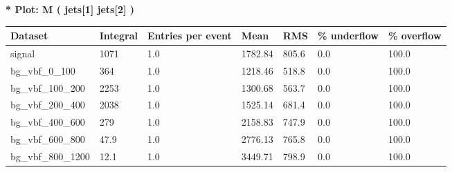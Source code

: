 \documentclass[a4paper, 10pt]{article}
\begin{document}
\textbf{* Plot: M ( jets[1] jets[2] ) }\\
   \begin{table}[H]
  \begin{center}
    \begin{tabular}{|m{23.0mm}|m{23.0mm}|m{18.0mm}|m{19.0mm}|m{19.0mm}|m{19.0mm}|m{19.0mm}|}
      \hline
      {\cellcolor{yellow}         Dataset}& {\cellcolor{yellow}         Integral}& {\cellcolor{yellow}         Entries per event}& {\cellcolor{yellow}         Mean}& {\cellcolor{yellow}         RMS}& {\cellcolor{yellow}         \% underflow}& {\cellcolor{yellow}         \% overflow}\\
      \hline
      {\cellcolor{white}         signal}& {\cellcolor{white}         1071}& {\cellcolor{white}         1.0}& {\cellcolor{white}         1782.84}& {\cellcolor{white}         805.6}& {\cellcolor{red}         0.0}& {\cellcolor{red}         100.0}\\
      \hline
      {\cellcolor{white}         bg\_vbf\_0\_100}& {\cellcolor{white}         364}& {\cellcolor{white}         1.0}& {\cellcolor{white}         1218.46}& {\cellcolor{white}         518.8}& {\cellcolor{red}         0.0}& {\cellcolor{red}         100.0}\\
      \hline
      {\cellcolor{white}         bg\_vbf\_100\_200}& {\cellcolor{white}         2253}& {\cellcolor{white}         1.0}& {\cellcolor{white}         1300.68}& {\cellcolor{white}         563.7}& {\cellcolor{red}         0.0}& {\cellcolor{red}         100.0}\\
      \hline
      {\cellcolor{white}         bg\_vbf\_200\_400}& {\cellcolor{white}         2038}& {\cellcolor{white}         1.0}& {\cellcolor{white}         1525.14}& {\cellcolor{white}         681.4}& {\cellcolor{red}         0.0}& {\cellcolor{red}         100.0}\\
      \hline
      {\cellcolor{white}         bg\_vbf\_400\_600}& {\cellcolor{white}         279}& {\cellcolor{white}         1.0}& {\cellcolor{white}         2158.83}& {\cellcolor{white}         747.9}& {\cellcolor{red}         0.0}& {\cellcolor{red}         100.0}\\
      \hline
      {\cellcolor{white}         bg\_vbf\_600\_800}& {\cellcolor{white}         47.9}& {\cellcolor{white}         1.0}& {\cellcolor{white}         2776.13}& {\cellcolor{white}         765.8}& {\cellcolor{red}         0.0}& {\cellcolor{red}         100.0}\\
      \hline
      {\cellcolor{white}         bg\_vbf\_800\_1200}& {\cellcolor{white}         12.1}& {\cellcolor{white}         1.0}& {\cellcolor{white}         3449.71}& {\cellcolor{white}         798.9}& {\cellcolor{red}         0.0}& {\cellcolor{red}         100.0}\\

\end{tabular}
\end{center}
\end{table}
\end{document}

